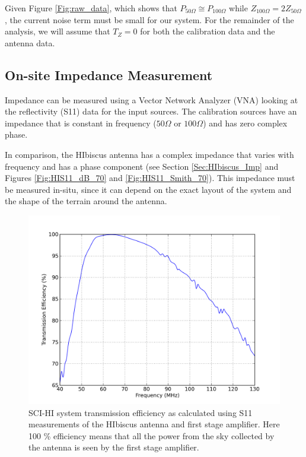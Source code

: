 Given Figure \ref{Fig:raw_data}, which shows that $P_{50 \Omega} \cong P_{100 \Omega}$ while $Z_{100 \Omega} = 2 Z_{50 \Omega}$, the current noise term must be small for our system. For the remainder of the analysis, we will assume that $T_Z = 0$ for both the calibration data and the antenna data. 


\subsection{On-site Impedance Measurement}

Impedance can be measured using a Vector Network Analyzer (VNA) looking at the reflectivity (S11) data for the input sources. The calibration sources have an impedance that is constant in frequency ($50 \Omega$ or $100 \Omega$) and has zero complex phase.

In comparison, the HIbiscus antenna has a complex impedance that varies with frequency and has a phase component (see Section \ref{Sec:HIbiscus_Imp} and Figures \ref{Fig:HIS11_dB_70} and \ref{Fig:HIS11_Smith_70}). This impedance must be measured in-situ, since it can depend on the exact layout of the system and the shape of the terrain around the antenna. 

\begin{figure}[htb]
\begin{center}
\includegraphics[width=0.9\linewidth]{Data_analysis/figures/old_ant_efficiency.png}
\caption{SCI-HI system transmission efficiency as calculated using S11 measurements of the HIbiscus antenna and first stage amplifier. Here 100 \% efficiency means that all the power from the sky collected by the antenna is seen by the first stage amplifier. }
\label{Fig:eff}
\end{center}
\end{figure}

